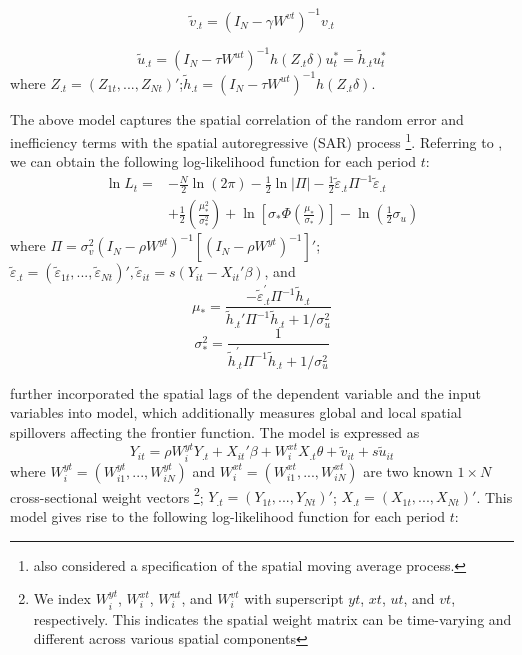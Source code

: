  \begin{equation}\label{eq2b}
 	\tilde{v}_{.t} =(I_N-\gamma W^{vt})^{-1}v_{.t} 
 \end{equation}
 
 \begin{equation}\label{eq3b}
 		\tilde{u}_{.t} =(I_N-\tau W^{ut})^{-1}h(Z_{.t}\delta)u_t^* = \tilde{h}_{.t}u_t^*
 \end{equation}
 where $Z_{.t}=(Z_{1t},...,Z_{Nt})'$;$\tilde{h}_{.t}=(I_N-\tau W^{ut})^{-1}h(Z_{.t}\delta)$.
 
  The above model captures the spatial correlation of  the random error and inefficiency terms with the spatial autoregressive (SAR) process \footnote{\cite{orea2019new} also considered a specification of the spatial moving average process.}.  Referring to \cite{wang2010estimating}, we can obtain the following log-likelihood function for each period $t$:
  \begin{equation}\label{eq5}
 	\begin{aligned}
 		\ln L_{t}= & -\frac{N}{2} \ln (2 \pi)-\frac{1}{2} \ln |\Pi|-\frac{1}{2} \tilde{\varepsilon}_{.t} \Pi^{-1} \tilde{\varepsilon}_{.t} \\
 		& +\frac{1}{2}\left(\frac{\mu_{*}^{2}}{\sigma_{*}^{2}}\right)+\ln \left[\sigma_{*} \Phi\left(\frac{\mu_{*}}{\sigma_{*}}\right)\right]-\ln \left(\frac{1}{2}\sigma_{u} \right)
 	\end{aligned}
 \end{equation}
where $\Pi=\sigma_v^2(I_N-\rho W^{yt})^{-1}[(I_N-\rho W^{yt})^{-1}]'$; $ \tilde{\varepsilon}_{.t} = ( \tilde{\varepsilon}_{1t},..., \tilde{\varepsilon}_{Nt})', \tilde{\varepsilon}_{it}=s(Y_{it}-X_{it}' \beta)$, and 
\begin{equation}
	\mu_*  =\frac{-\tilde{\varepsilon}_{.t}^{\prime} \Pi^{-1} \tilde{h}_{.t}}{\tilde{h}_{.t}' \Pi^{-1} \tilde{h}_{.t}+1 / \sigma_u^2}
\end{equation}
\begin{equation}
	\sigma_*^2  =\frac{1}{\tilde{h}_{.t}^{\prime} \Pi^{-1} \tilde{h}_{.t}+1 / \sigma_u^2}
\end{equation}

 
\cite{galli2022spatial} further incorporated the spatial lags of the dependent variable and the input variables into \cite{orea2019new} model, which additionally measures global and local spatial spillovers affecting the frontier function.  The model is expressed as
\begin{equation}\label{gallimodel}
	Y_{it} = \rho W_{i}^{yt}Y_{.t}+X_{it}'\beta+ W_{i}^{xt}X_{.t} \theta + \tilde{v}_{it}+s\tilde{u}_{it}
\end{equation}
where $W_{i}^{yt}=(W_{i1}^{yt},...,W_{iN}^{yt})$ and $W_{i}^{xt}=(W_{i1}^{xt},...,W_{iN}^{xt})$ are two known $1 \times N$ cross-sectional weight vectors \footnote{We index $W_{i}^{yt}$, $W_{i}^{xt}$, $W_{i}^{ut}$, and $W_{i}^{vt}$ with superscript $yt$, $xt$, $ut$, and $vt$, respectively. This indicates the spatial weight matrix can be time-varying and different across various spatial components}; $Y_{.t} = (Y_{1t},..., Y_{Nt})'$; $X_{.t} = (X_{1t},..., X_{Nt})'$.  This model gives rise to the following log-likelihood function for each period $t$: 

